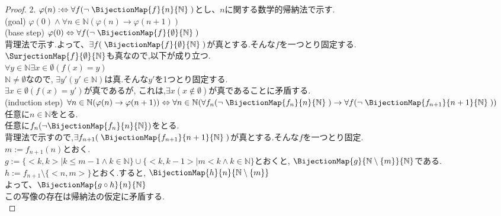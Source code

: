 \begin{proof} 2. $\varphi (n) :\Leftrightarrow \forall f( \lnot \; \BijectionMap{f}{n}{\mathbb{N}} \; )$とし、$n$に関する数学的帰納法で示す.\\
(goal) $\varphi (0) \land \forall n \in \mathbb{N} ( \varphi (n) \rightarrow \varphi (n+1))$\\

(base step) $\varphi (0) \Leftrightarrow  \forall f( \lnot \; \BijectionMap{f}{\emptyset}{\mathbb{N}} \; )$ \\
背理法で示す.よって、$\exists f(  \; \BijectionMap{f}{\emptyset}{\mathbb{N}} \; )$が真とする.そんな$f$を一つとり固定する.\\
$\SurjectionMap{f}{\emptyset}{\mathbb{N}}$も真なので,以下が成り立つ.\\
$\forall y \in \mathbb{N} \exists x \in \emptyset (f(x) = y)$\\
$\mathbb{N} \neq \emptyset$なので,
$\exists y'(y' \in \mathbb{N})$は真.そんな$y'$を1つとり固定する.\\
$\exists x \in \emptyset (f(x) = y')$が真であるが,
これは,$\exists x (x \not\in \emptyset)$が真であることに矛盾する.\\

(induction step) $\forall n \in \mathbb{N} ( \varphi (n) \rightarrow \varphi (n+1)) 
\Leftrightarrow \forall n \in \mathbb{N} ( \forall f_n( \lnot \; \BijectionMap{f_n}{n}{\mathbb{N}} \; ) \rightarrow \forall f( \lnot \; \BijectionMap{f_{n+1}}{n+1}{\mathbb{N}} \; ))$\\
任意に$n \in \mathbb{N}$をとる.\\
任意に$f_n(\lnot \BijectionMap{f_n}{n}{\mathbb{N}})$をとる.\\
背理法で示すので,$\exists f_{n+1}(\; \BijectionMap{f_{n+1}}{n+1}{\mathbb{N}} \; )$が真とする.そんな$f$を一つとり固定.\\
$m := f_{n+1}(n)$とおく.\\
$g:=\{<k,k> \mid k \leq m-1 \land k \in \mathbb{N}\} \cup \{<k,k-1> \mid m < k \land k \in \mathbb{N}\}$とおくと,
$\BijectionMap{g}{\mathbb{N} \setminus \{m\}}{\mathbb{N}}$である.\\
$h:= f_{n+1} \setminus \{<n, m>\}$とおく.すると,
$\BijectionMap{h}{n}{\mathbb{N} \setminus \{m\}}$\\
よって、$\BijectionMap{g \circ h}{n}{\mathbb{N}}$\\
この写像の存在は帰納法の仮定に矛盾する.\\
\end{proof}

